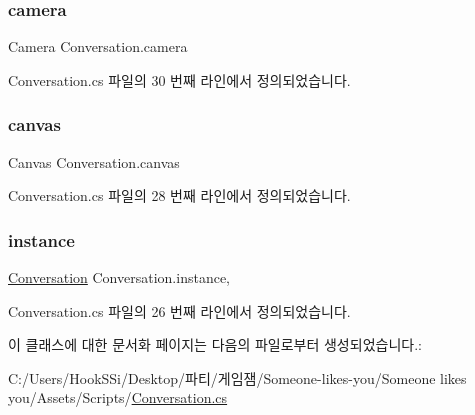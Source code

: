 \subsubsection{\texorpdfstring{camera}{camera}}
{\footnotesize\ttfamily Camera Conversation.\+camera}



Conversation.\+cs 파일의 30 번째 라인에서 정의되었습니다.

\mbox{\label{class_conversation_ae4e6edf2f8277a7d878de37494e4f9ab}} 
\subsubsection{\texorpdfstring{canvas}{canvas}}
{\footnotesize\ttfamily Canvas Conversation.\+canvas}



Conversation.\+cs 파일의 28 번째 라인에서 정의되었습니다.

\mbox{\label{class_conversation_a4dff96bb1448dc4396b031d8062461a9}} 
\subsubsection{\texorpdfstring{instance}{instance}}
{\footnotesize\ttfamily \mbox{\hyperlink{class_conversation}{Conversation}} Conversation.\+instance\hspace{0.3cm}{\ttfamily [static]}, {\ttfamily [private]}}



Conversation.\+cs 파일의 26 번째 라인에서 정의되었습니다.



이 클래스에 대한 문서화 페이지는 다음의 파일로부터 생성되었습니다.\+:\begin{DoxyCompactItemize}
\item 
C\+:/\+Users/\+Hook\+S\+Si/\+Desktop/파티/게임잼/\+Someone-\/likes-\/you/\+Someone likes you/\+Assets/\+Scripts/\mbox{\hyperlink{_conversation_8cs}{Conversation.\+cs}}\end{DoxyCompactItemize}
